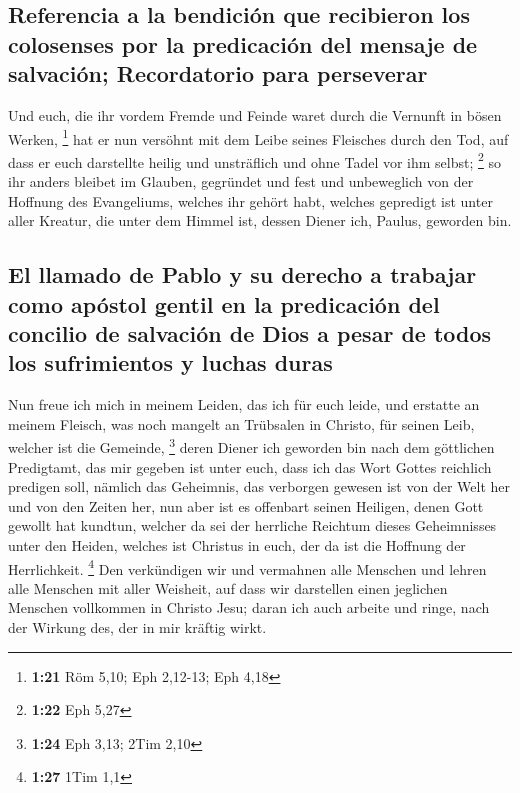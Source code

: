 \hypertarget{referencia-a-la-bendiciuxf3n-que-recibieron-los-colosenses-por-la-predicaciuxf3n-del-mensaje-de-salvaciuxf3n-recordatorio-para-perseverar}{%
\subsection{Referencia a la bendición que recibieron los colosenses por
la predicación del mensaje de salvación; Recordatorio para
perseverar}\label{referencia-a-la-bendiciuxf3n-que-recibieron-los-colosenses-por-la-predicaciuxf3n-del-mensaje-de-salvaciuxf3n-recordatorio-para-perseverar}}

 Und euch, die ihr vordem Fremde und Feinde waret durch
die Vernunft in bösen Werken, \footnote{\textbf{1:21} Röm 5,10; Eph
  2,12-13; Eph 4,18}  hat er nun versöhnt mit dem Leibe
seines Fleisches durch den Tod, auf dass er euch darstellte heilig und
unsträflich und ohne Tadel vor ihm selbst; \footnote{\textbf{1:22} Eph
  5,27}  so ihr anders bleibet im Glauben, gegründet und
fest und unbeweglich von der Hoffnung des Evangeliums, welches ihr
gehört habt, welches gepredigt ist unter aller Kreatur, die unter dem
Himmel ist, dessen Diener ich, Paulus, geworden bin.

\hypertarget{el-llamado-de-pablo-y-su-derecho-a-trabajar-como-apuxf3stol-gentil-en-la-predicaciuxf3n-del-concilio-de-salvaciuxf3n-de-dios-a-pesar-de-todos-los-sufrimientos-y-luchas-duras}{%
\subsection{El llamado de Pablo y su derecho a trabajar como apóstol
gentil en la predicación del concilio de salvación de Dios a pesar de
todos los sufrimientos y luchas
duras}\label{el-llamado-de-pablo-y-su-derecho-a-trabajar-como-apuxf3stol-gentil-en-la-predicaciuxf3n-del-concilio-de-salvaciuxf3n-de-dios-a-pesar-de-todos-los-sufrimientos-y-luchas-duras}}

 Nun freue ich mich in meinem Leiden, das ich für euch
leide, und erstatte an meinem Fleisch, was noch mangelt an Trübsalen in
Christo, für seinen Leib, welcher ist die Gemeinde, \footnote{\textbf{1:24}
  Eph 3,13; 2Tim 2,10}  deren Diener ich geworden bin
nach dem göttlichen Predigtamt, das mir gegeben ist unter euch, dass ich
das Wort Gottes reichlich predigen soll,  nämlich das
Geheimnis, das verborgen gewesen ist von der Welt her und von den Zeiten
her, nun aber ist es offenbart seinen Heiligen,  denen
Gott gewollt hat kundtun, welcher da sei der herrliche Reichtum dieses
Geheimnisses unter den Heiden, welches ist Christus in euch, der da ist
die Hoffnung der Herrlichkeit. \footnote{\textbf{1:27} 1Tim 1,1}
 Den verkündigen wir und vermahnen alle Menschen und
lehren alle Menschen mit aller Weisheit, auf dass wir darstellen einen
jeglichen Menschen vollkommen in Christo Jesu;  daran ich
auch arbeite und ringe, nach der Wirkung des, der in mir kräftig wirkt.

